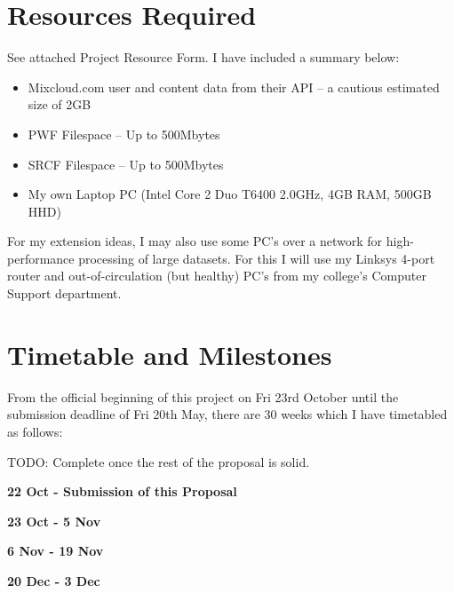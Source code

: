\section{Resources Required}
See attached Project Resource Form. I have included a summary below:
\begin{itemize}
\item Mixcloud.com user and content data from their API -- a cautious estimated size of 2GB
\item PWF Filespace -- Up to 500Mbytes
\item SRCF Filespace  -- Up to 500Mbytes
\item My own Laptop PC (Intel Core 2 Duo T6400 2.0GHz, 4GB RAM, 500GB HHD)
\end{itemize}
For my extension ideas, I may also use some PC's over a network for high-performance processing of large datasets. For this I will use my Linksys 4-port router and out-of-circulation (but healthy) PC's from my college's Computer Support department.


\section{Timetable and Milestones}

From the official beginning of this project on Fri 23rd October until the submission deadline of Fri 20th May, there are 30 weeks which I have timetabled as follows:

TODO: Complete once the rest of the proposal is solid.

\textbf{22 Oct - Submission of this Proposal}

\textbf{23 Oct - 5 Nov}


\textbf{6 Nov - 19 Nov}


\textbf{20 Dec - 3 Dec}


